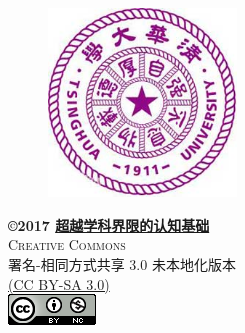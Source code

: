 \documentclass[11pt,fleqn]{book}
\makeatletter
\renewcommand{\cleardoublepage}{
	\clearpage\ifodd\c@page\else
	\hbox{}
	\vspace*{\fill}
	\thispagestyle{empty}
	\newpage
	\fi}
\numberwithin{dummy}{section}
\theoremstyle{ocrenumbox}
\theoremstyle{blacknumex}
\theoremstyle{blacknumbox}
\theoremstyle{ocrenum}
\newif\ifusechapterimage
\newcommand{\thechapterimage}{}%
\newcommand{\chapterimage}[1]{\ifusechapterimage\renewcommand{\thechapterimage}{#1}\fi}%
\makeatother
\begin{document}

\newpage
~\vfill
\begin{figure}[h]
	\centering\includegraphics[width=5cm]{123.jpg}
\end{figure}


\begin{center}
	{\sffamily
		\textbf{\copyright 2017 \href{http://toyhouse.cc/wiki/index.php/Seven_Brief_Lessons_on_Physics}{\textbf{超越学科界限的认知基础}}}\\
		\textsc{Creative Commons}\\
		
		署名-相同方式共享 3.0 未本地化版本\\
		\href{https://creativecommons.org/licenses/by-sa/3.0/legalcode}{(CC BY-SA 3.0)}\\[12pt]
		\includegraphics{Pictures/license.png}\\[12pt]
	}
\end{center}




\chapterimage{chapter_head_1.pdf} %

\pagestyle{empty} %

\tableofcontents %

\cleardoublepage %
\end{document}
